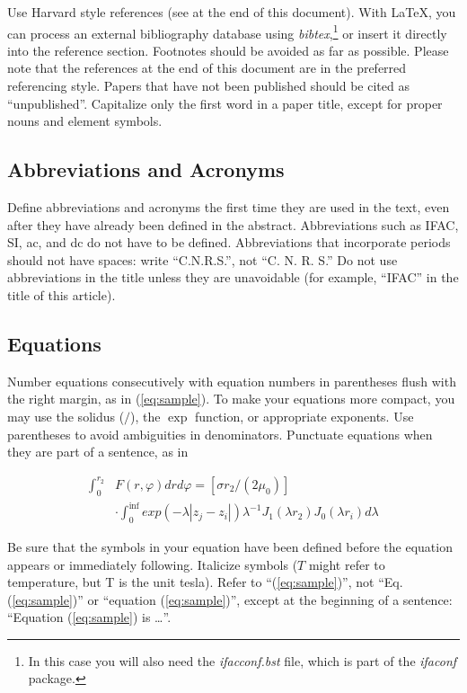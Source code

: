\documentclass{ifacconf}
\begin{document}
Use Harvard style references (see at the end of this document). With
\LaTeX, you can process an external bibliography database 
using \textit{bibtex},\footnote{In this case you will also need the \textit{ifacconf.bst}
file, which is part of the \textit{ifaconf} package.}
or insert it directly into the reference section. Footnotes should be avoided as
far as possible.  Please note that the references at the end of this
document are in the preferred referencing style. Papers that have not
been published should be cited as ``unpublished''.  Capitalize only the
first word in a paper title, except for proper nouns and element
symbols.

\subsection{Abbreviations and Acronyms}

Define abbreviations and acronyms the first time they are used in the
text, even after they have already been defined in the
abstract. Abbreviations such as IFAC, SI, ac, and dc do not have to be
defined. Abbreviations that incorporate periods should not have
spaces: write ``C.N.R.S.'', not ``C. N. R. S.'' Do not use abbreviations
in the title unless they are unavoidable (for example, ``IFAC'' in the
title of this article).

\subsection{Equations}

Number equations consecutively with equation numbers in parentheses
flush with the right margin, as in (\ref{eq:sample}).  To make your equations more
compact, you may use the solidus ($/$), the $\exp$ function, or
appropriate exponents. Use parentheses to avoid ambiguities in
denominators. Punctuate equations when they are part of a sentence, as
in

\begin{equation} \label{eq:sample2}
\begin{array}{ll}
\int_0^{r_2} & F (r, \varphi ) dr d\varphi = [\sigma r_2 / (2 \mu_0 )] \\
& \cdot \int_0^{\inf} exp(-\lambda |z_j - z_i |) \lambda^{-1} J_1 (\lambda  r_2 ) J_0 (\lambda r_i ) d\lambda 
\end{array}
\end{equation}

Be sure that the symbols in your equation have been defined before the
equation appears or immediately following. Italicize symbols ($T$
might refer to temperature, but T is the unit tesla). Refer to
``(\ref{eq:sample})'', not ``Eq. (\ref{eq:sample})'' or ``equation
(\ref{eq:sample})'', except at the beginning of a sentence: ``Equation
(\ref{eq:sample}) is \ldots''.
\end{document}
